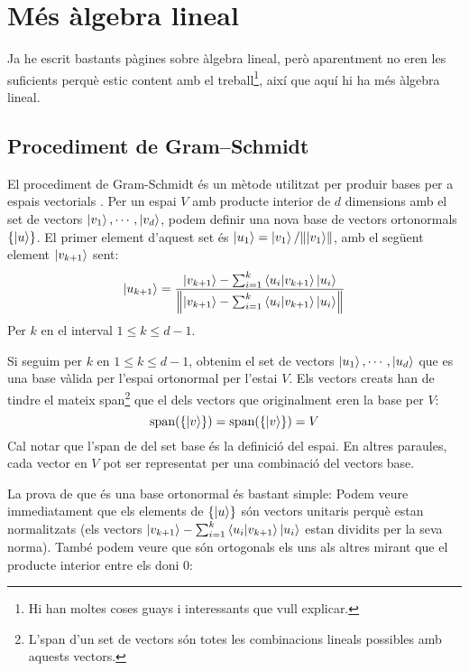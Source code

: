 \chapter{Més àlgebra lineal}
Ja he escrit bastants pàgines sobre àlgebra lineal, però aparentment no eren les suficients perquè estic content amb el treball\footnote{Hi han moltes coses guays i interessants que vull explicar.}, així que aquí hi ha més àlgebra lineal.


\section{Procediment de Gram–Schmidt}\label{gram}
El procediment de Gram-Schmidt és un mètode utilitzat per produir bases per a espais vectorials \cite{QCandQI:GramSchmidt}. Per un espai $V$ amb producte interior de $d$ dimensions amb el set de vectors ${\ket{v_1}, \cdots, \ket{v_d}}$, podem definir una nova base de vectors ortonormals $\{\ket{u}\}$. El primer element d'aquest set és $\ket{u_1} = \ket{v_1}/\norm{\ket{v_1}}$, amb el següent element $\ket{v_{k+1}}$ sent:
$$
\ket{u_{k+1}} = \frac{\ket{v_{k+1}} - \sum_{i=1}^{k} \bra{u_i}\ket{v_{k+1}}\ket{u_i}}{\norm{\ket{v_{k+1}} - \sum_{i=1}^{k} \bra{u_i}\ket{v_{k+1}}\ket{u_i}}}
$$
Per $k$ en el interval $1 \leq k \leq d-1$.

Si seguim per $k$ en $1 \leq k \leq d-1$, obtenim el set de vectors ${\ket{u_1}, \cdots , \ket{u_d}}$ que es una base vàlida per l'espai ortonormal per l'estai $V$. Els vectors creats han de tindre el mateix span\footnote{L'span d'un set de vectors són totes les combinacions lineals possibles amb aquests vectors.} que el dels vectors que originalment eren la base per $V$:
$$
\text{span}(\{\ket{v}\}) = \text{span}(\{\ket{v}\}) = V
$$
Cal notar que l'span de del set base és la definició del espai. En altres paraules, cada vector en $V$ pot ser representat per una combinació del vectors base. 

La prova de que és una base ortonormal és bastant simple:
Podem veure immediatament que els elements  de $\{ \ket{u} \}$ són vectors unitaris perquè estan normalitzats (els vectors $\ket{v_{k+1}} - \sum_{i=1}^{k} \bra{u_i}\ket{v_{k+1}}\ket{u_i}$ estan dividits per la seva norma). També podem veure que són ortogonals els uns als altres mirant que el producte interior entre els doni 0:

